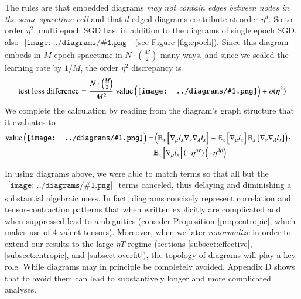\documentclass{article}
\newcommand{\dvalue}{\text{\textnormal{value}}}
\newcommand{\expc}{\mathbb{E}}
\newcommand{\wrap}[1]{\left(#1\right)}
\newcommand{\wasq}[1]{\left[#1\right]}
\newcommand{\sdia}[1]{\begin{gathered}\texttt{[image: ../diagrams/\#1.png]}\end{gathered}}
\begin{document}
        The rules are that embedded diagrams \emph{may not contain edges between
        nodes in the same spacetime cell}
        and that $d$-edged diagrams contribute at order $\eta^d$.
        So to order $\eta^2$, multi epoch SGD has, in addition to the
        diagrams of single epoch SGD, also 
        $\sdia{c(01-2)(01-12)}$
        (see Figure \ref{fig:epoch}).
        Since this diagram embeds in $M$-epoch spacetime in
        $N\cdot{M\choose 2}$ many ways, and since we scaled the learning rate
        by $1/M$, the order $\eta^2$ discrepancy is
        $$
            \text{test loss difference} =  
            \frac{N\cdot {M\choose 2}}{M^2}~
            \dvalue\wrap{\sdia{c(01-2)(01-12)}}
            + o(\eta^2)
        $$
        We complete the calculation by reading from the diagram's graph
        structure that it evaluates to
        \begin{align*}
            \dvalue\wrap{\sdia{c(01-2)(01-12)}}
            =
            &\wrap{
                \expc_{x}\wasq{\nabla_\mu l_x \nabla_\nu \nabla_\lambda l_x} 
                -
                \expc_{x}\wasq{\nabla_\mu l_x}
                \expc_{x}\wasq{\nabla_\nu \nabla_\lambda l_x} 
            } \cdot \\
            &\expc_{x}\wasq{\nabla_\rho l_x}
            \wrap{-\eta^{\mu\nu}} \wrap{-\eta^{\lambda\rho}}
        \end{align*}

        In using diagrams above, we were able to match terms so that all but
        the $\sdia{c(01-2)(01-12)}$ terms canceled, thus delaying and
        diminishing a substantial algebraic mess.  In fact, diagrams  
        concisely represent correlation and tensor-contraction patterns that
        when written explicitly are complicated and when suppressed lead to
        ambiguities (consider Proposition \ref{prop:entropic}, which makes
        use of 4-valent tensors).  Moreover, when we later \emph{renormalize}
        in order to extend our results to the large-$\eta T$ regime (sections
        \ref{subsect:effective}, \ref{subsect:entropic}, and
        \ref{subsect:overfit}), the topology of diagrams will play a key role.  
        While diagrams may in principle be completely avoided,
        Appendix D shows that to avoid them can lead to
        substantively longer and more complicated analyses.   

\end{document}
